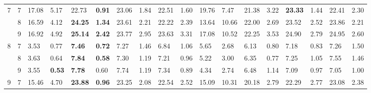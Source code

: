 \documentclass[conference]{IEEEtran}
\begin{document}
\begin{table*}[]
\begin{tabular}{|cl|ll|ll|ll|ll|ll|ll|ll|ll|}
		\multicolumn{1}{|c|}{\multirow{3}{*}{7}} & 7 & \multicolumn{1}{l|}{17.08} & 5.17 & \multicolumn{1}{l|}{22.73} & \textbf{0.91} & \multicolumn{1}{l|}{23.06} & 1.84 & \multicolumn{1}{l|}{22.51} & 1.60 & \multicolumn{1}{l|}{19.76} & 7.47 & \multicolumn{1}{l|}{21.38} & 3.22 & \multicolumn{1}{l|}{\textbf{23.33}} & 1.44 & \multicolumn{1}{l|}{22.41} & 2.30 \\ \cline{2-18} 
		\multicolumn{1}{|c|}{} & 8 & \multicolumn{1}{l|}{16.59} & 4.12 & \multicolumn{1}{l|}{\textbf{24.25}} & \textbf{1.34} & \multicolumn{1}{l|}{23.61} & 2.21 & \multicolumn{1}{l|}{22.22} & 2.39 & \multicolumn{1}{l|}{13.64} & 10.66 & \multicolumn{1}{l|}{22.00} & 2.69 & \multicolumn{1}{l|}{23.52} & 2.52 & \multicolumn{1}{l|}{23.86} & 2.21 \\ \cline{2-18} 
		\multicolumn{1}{|c|}{} & 9 & \multicolumn{1}{l|}{16.92} & 4.92 & \multicolumn{1}{l|}{\textbf{25.14}} & \textbf{2.42} & \multicolumn{1}{l|}{23.77} & 2.95 & \multicolumn{1}{l|}{23.63} & 3.31 & \multicolumn{1}{l|}{17.08} & 10.52 & \multicolumn{1}{l|}{22.25} & 3.53 & \multicolumn{1}{l|}{24.90} & 2.79 & \multicolumn{1}{l|}{24.95} & 2.60 \\ \hline
		\multicolumn{1}{|c|}{\multirow{3}{*}{8}} & 7 & \multicolumn{1}{l|}{3.53} & 0.77 & \multicolumn{1}{l|}{\textbf{7.46}} & \textbf{0.72} & \multicolumn{1}{l|}{7.27} & 1.46 & \multicolumn{1}{l|}{6.84} & 1.06 & \multicolumn{1}{l|}{5.65} & 2.68 & \multicolumn{1}{l|}{6.13} & 0.80 & \multicolumn{1}{l|}{7.18} & 0.83 & \multicolumn{1}{l|}{7.26} & 1.50 \\ \cline{2-18} 
		\multicolumn{1}{|c|}{} & 8 & \multicolumn{1}{l|}{3.63} & 0.64 & \multicolumn{1}{l|}{\textbf{7.84}} & \textbf{0.58} & \multicolumn{1}{l|}{7.30} & 1.19 & \multicolumn{1}{l|}{7.21} & 0.96 & \multicolumn{1}{l|}{5.22} & 3.00 & \multicolumn{1}{l|}{6.35} & 0.77 & \multicolumn{1}{l|}{7.25} & 1.05 & \multicolumn{1}{l|}{7.55} & 1.46 \\ \cline{2-18} 
		\multicolumn{1}{|c|}{} & 9 & \multicolumn{1}{l|}{3.55} & \textbf{0.53} & \multicolumn{1}{l|}{\textbf{7.78}} & 0.60 & \multicolumn{1}{l|}{7.74} & 1.19 & \multicolumn{1}{l|}{7.34} & 0.89 & \multicolumn{1}{l|}{4.34} & 2.74 & \multicolumn{1}{l|}{6.48} & 1.14 & \multicolumn{1}{l|}{7.09} & 0.97 & \multicolumn{1}{l|}{7.05} & 1.00 \\ \hline
		\multicolumn{1}{|c|}{\multirow{3}{*}{9}} & 7 & \multicolumn{1}{l|}{15.46} & 4.70 & \multicolumn{1}{l|}{\textbf{23.88}} & \textbf{0.96} & \multicolumn{1}{l|}{23.25} & 2.08 & \multicolumn{1}{l|}{22.54} & 2.52 & \multicolumn{1}{l|}{15.09} & 10.31 & \multicolumn{1}{l|}{20.18} & 2.79 & \multicolumn{1}{l|}{22.29} & 2.77 & \multicolumn{1}{l|}{23.08} & 2.38 \\ \cline{2-18} 

\end{tabular}
\end{table*}
\end{document}
